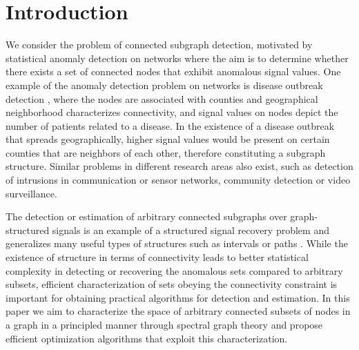 \documentclass{article}
\begin{document}
\section{Introduction}

We consider the problem of connected subgraph detection, motivated by statistical anomaly detection on networks where the aim is to determine whether there exists a set of connected nodes that exhibit anomalous signal values. %
One example of the anomaly detection problem on networks is disease outbreak detection \cite{disease}, where the nodes are associated with counties and geographical neighborhood characterizes connectivity, and signal values on nodes depict the number of patients related to a disease. In the existence of a disease outbreak that spreads geographically, higher signal values would be present on certain counties that are neighbors of each other, therefore constituting a subgraph structure. Similar problems in different research areas also exist, such as detection of intrusions in communication or sensor networks, community detection or video surveillance.  %


The detection or estimation of arbitrary connected subgraphs over graph-structured signals is an example of a structured signal recovery problem and generalizes many useful types of structures such as intervals or paths \cite{addario,maze}. While the existence of structure in terms of connectivity leads to better statistical complexity in detecting or recovering the anomalous sets compared to arbitrary subsets, efficient characterization of sets obeying the connectivity constraint is important for obtaining practical algorithms for detection and estimation. In this paper we aim to characterize the space of arbitrary connected subsets of nodes in a graph in a principled manner through spectral graph theory and propose efficient optimization algorithms that exploit this characterization.
\end{document}
